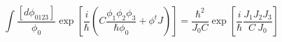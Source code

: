 \begin{equation}
\label{eleg}
\int \frac{[d\phi_{0123}]}{\phi_0} \exp\left[
\frac{i}{\hbar} \left( 
C \frac{\phi_1 \phi_2 \phi_3}{\hbar \phi_0} + \phi^t J \right)\right]
=
 \frac{\hbar^2}{J_0 C}
 \exp\left[ \frac{i}{\hbar}  \frac{J_1 J_2 J_3}{C~J_0} \right]
\end{equation}

